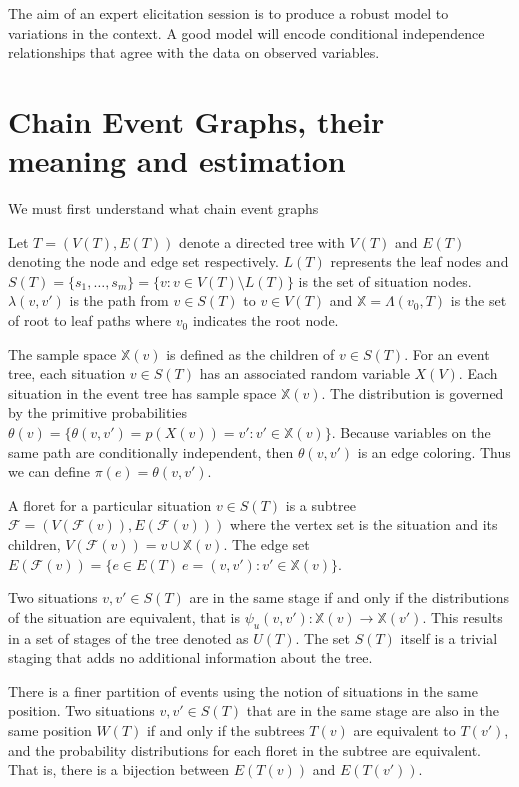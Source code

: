 \documentclass[12pt]{article}
\begin{document}
The aim of an expert elicitation session is to produce a robust model to variations in the context. A good model will encode conditional independence relationships that agree with the data on observed variables.

\section{Chain Event Graphs, their meaning and estimation}

We must first understand what chain event graphs 

Let $T =( V(T),E(T))$ denote a directed tree with $V(T)$ and $E(T)$ denoting the node and edge set respectively. $L(T)$ represents the leaf nodes and $S(T) = \{s_1, \ldots, s_m\} =  \{v: v \in V(T) \setminus L(T)\}$ is the set of situation nodes. $\lambda (v,v')$ is the path from $v \in S(T)$ to $v \in V(T)$ and $\mathbb{X} = \Lambda(v_0,T) $ is the set of root to leaf paths where $v_0$ indicates the root node.  

The sample space $\mathbb{X}(v)$ is defined as the children of $v \in S(T)$. For an event tree, each situation $v \in S(T)$ has an associated random variable $X(V)$. Each situation in the event tree has sample space $\mathbb{X}(v)$. The distribution is governed by the primitive probabilities $\theta(v) = \{ \theta(v,v') = p(X(v)) = v' : v' \in \mathbb{X}(v)\}$. Because variables on the same path are conditionally independent, then $\theta(v,v')$ is an edge coloring. Thus we can define $\pi(e) = \theta(v,v')$.

A floret for a particular situation $v \in S(T)$ is a subtree $\mathcal{F} = (V(\mathcal{F}(v)), E(\mathcal{F}(v)))$ where the vertex set is the situation and its children, $V(\mathcal{F}(v)) = v \cup \mathbb{X}(v)$. The edge set $E(\mathcal{F}(v)) = \{ e \in E(T) \: e = (v,v') : v' \in \mathbb{X}(v) \}$. 

Two situations $v, v' \in S(T)$ are in the same stage if and only if the distributions of the situation are equivalent, that is $\psi_u(v,v') : \mathbb{X}(v) \to \mathbb{X}(v')$. This results in a set of stages of the tree denoted as $U(T)$. The set $S(T)$ itself is a trivial staging that adds no additional information about the tree. 

There is a finer partition of events using the notion of situations in the same position. Two situations $v, v' \in S(T)$ that are in the same stage are also in the same position $W(T)$ if and only if the subtrees $T(v)$ are equivalent to $T(v')$, and the probability distributions for each floret in the subtree are equivalent. That is, there is a bijection between $E(T(v))$ and $E(T(v'))$. 
\end{document}
